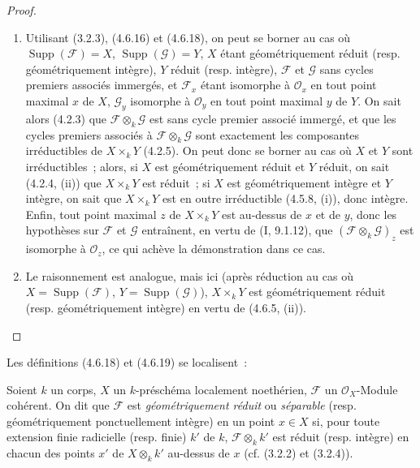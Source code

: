 \begin{proof}
\begin{enumerate}
\item[(i)] Utilisant (3.2.3), (4.6.16) et (4.6.18), on peut se borner au cas où
$\operatorname{Supp}(\mathscr F)=X$, $\operatorname{Supp}(\mathscr G)=Y$, $X$
étant géométriquement réduit (resp. géométriquement intègre), $Y$ réduit
(resp. intègre), $\mathscr F$ et $\mathscr G$ sans cycles premiers associés
immergés, et $\mathscr F_x$ étant isomorphe à $\mathcal O_x$ en tout point
maximal $x$ de $X$, $\mathscr G_y$ isomorphe à $\mathcal O_y$ en tout point
maximal $y$ de $Y$. On sait alors (4.2.3) que
$\mathscr F\otimes_k\mathscr G$ est sans cycle premier associé immergé, et que
les cycles premiers associés à $\mathscr F\otimes_k\mathscr G$ sont exactement
les composantes irréductibles de $X\times_k Y$ (4.2.5). On peut donc se borner
au cas où $X$ et $Y$ sont irréductibles~; alors, si $X$ est géométriquement
réduit et $Y$ réduit, on sait (4.2.4, (ii)) que $X\times_k Y$ est réduit~; si
$X$ est géométriquement intègre et $Y$ intègre, on sait que $X\times_k Y$ est
en outre irréductible (4.5.8, (i)), donc intègre. Enfin, tout point maximal $z$
de $X\times_k Y$ est au-dessus de $x$ et de $y$, donc les hypothèses sur
$\mathscr F$ et $\mathscr G$ entraînent, en vertu de (I, 9.1.12), que
$(\mathscr F\otimes_k\mathscr G)_z$ est isomorphe à $\mathcal O_z$, ce qui
achève la démonstration dans ce cas.

\item[(ii)] Le raisonnement est analogue, mais ici (après réduction au cas où
$X=\operatorname{Supp}(\mathscr F)$, $Y=\operatorname{Supp}(\mathscr G)$),
$X\times_k Y$ est géométriquement réduit (resp. géométriquement intègre) en
vertu de (4.6.5, (ii)).
\end{enumerate}
\end{proof}

Les définitions (4.6.18) et (4.6.19) se localisent~:

\begin{definition}[4.6.22]
\label{IV.2.4.6.22-fr}
Soient $k$ un corps, $X$ un $k$-préschéma localement noethérien, $\mathscr F$
un $\mathcal O_X$-Module cohérent. On dit que $\mathscr F$ est
\emph{géométriquement réduit} ou \emph{séparable} (resp. géométriquement
ponctuellement intègre) en un point $x\in X$ si, pour toute extension finie
radicielle (resp. finie) $k'$ de $k$, $\mathscr F\otimes_k k'$ est réduit
(resp. intègre) en chacun des points $x'$ de $X\otimes_k k'$ au-dessus de $x$
(cf. (3.2.2) et (3.2.4)).
\end{definition}

